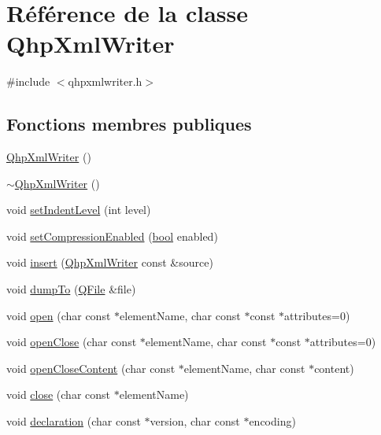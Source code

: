 \hypertarget{class_qhp_xml_writer}{}\section{Référence de la classe Qhp\+Xml\+Writer}
\label{class_qhp_xml_writer}


{\ttfamily \#include $<$qhpxmlwriter.\+h$>$}

\subsection*{Fonctions membres publiques}
\begin{DoxyCompactItemize}
\item 
\hyperlink{class_qhp_xml_writer_abd4b15277a70492b8ff31ebed3cd81c1}{Qhp\+Xml\+Writer} ()
\item 
\hyperlink{class_qhp_xml_writer_a55da4bd8c669239aa83126295fcde903}{$\sim$\+Qhp\+Xml\+Writer} ()
\item 
void \hyperlink{class_qhp_xml_writer_a123d00e83e99a92ed17197bd5af02e22}{set\+Indent\+Level} (int level)
\item 
void \hyperlink{class_qhp_xml_writer_abcb9a02176e91e793f539f349f6f6f87}{set\+Compression\+Enabled} (\hyperlink{qglobal_8h_a1062901a7428fdd9c7f180f5e01ea056}{bool} enabled)
\item 
void \hyperlink{class_qhp_xml_writer_ad6c47073ba62731ec5717abc48189c6e}{insert} (\hyperlink{class_qhp_xml_writer}{Qhp\+Xml\+Writer} const \&source)
\item 
void \hyperlink{class_qhp_xml_writer_a4774f32eef656819475f1d68778c356b}{dump\+To} (\hyperlink{class_q_file}{Q\+File} \&file)
\item 
void \hyperlink{class_qhp_xml_writer_a1aebd4452891a3e71899b13ed7e21bcb}{open} (char const $\ast$element\+Name, char const $\ast$const $\ast$attributes=0)
\item 
void \hyperlink{class_qhp_xml_writer_a879cff85acf2a0fdc058a7e3c6161008}{open\+Close} (char const $\ast$element\+Name, char const $\ast$const $\ast$attributes=0)
\item 
void \hyperlink{class_qhp_xml_writer_adbab0f4cde60e8f37061081078fa7be2}{open\+Close\+Content} (char const $\ast$element\+Name, char const $\ast$content)
\item 
void \hyperlink{class_qhp_xml_writer_ad714a9eacec5e599c05d4d2f042536e5}{close} (char const $\ast$element\+Name)
\item 
void \hyperlink{class_qhp_xml_writer_a0be9988f8d6e3873f21e14c9fe53c024}{declaration} (char const $\ast$version, char const $\ast$encoding)
\end{DoxyCompactItemize}
